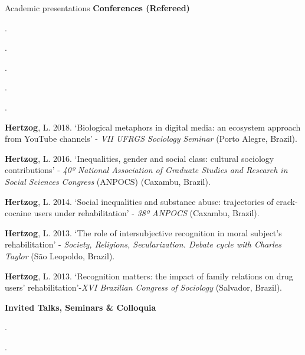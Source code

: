 \begin{rSection}{Academic presentations}
\hspace{2em}\large \textbf{Conferences (Refereed)}
\vspace{1em}
\begin{etaremune}
\item {}
\item {}.
\item {}.
\item {}.
\item {}.
\item {}.

\item \textbf{Hertzog}, L. 2018. ‘Biological metaphors in digital media: an ecosystem approach from YouTube channels’ - \textit{VII UFRGS Sociology Seminar} (Porto Alegre, Brazil).

\item \textbf{Hertzog}, L. 2016. ‘Inequalities, gender and social class: cultural sociology contributions’ - \textit{40º National Association of Graduate Studies and Research in Social Sciences Congress} (ANPOCS) (Caxambu, Brazil).

\item \textbf{Hertzog}, L. 2014. ‘Social inequalities and substance abuse: trajectories of crack-cocaine users under rehabilitation’ - \textit{38º ANPOCS} (Caxambu, Brazil).

\item \textbf{Hertzog}, L. 2013. ‘The role of intersubjective recognition in moral subject's rehabilitation’ - \textit{Society, Religions, Secularization. Debate cycle with Charles Taylor} (São Leopoldo, Brazil).

\item \textbf{Hertzog}{, L. 2013. ‘Recognition matters: the impact of family relations on drug users’ rehabilitation’-}\textit{XVI Brazilian Congress of Sociology} (Salvador, Brazil).

\vspace{1em}
\large  {\textbf{Invited Talks, Seminars \& Colloquia}}
\vspace{1em}

\item {}.

\item {}.


\end{etaremune}
\end{rSection}
